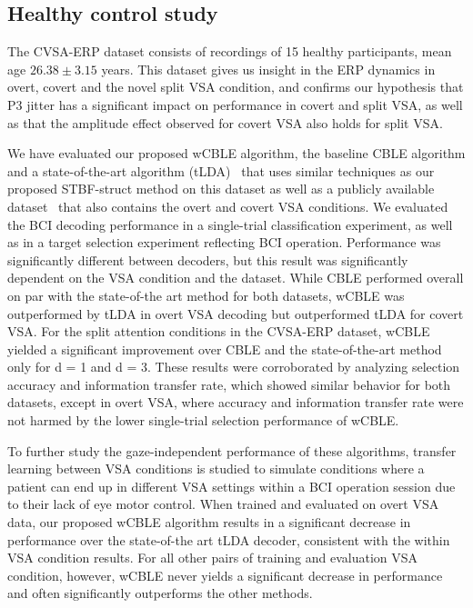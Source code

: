 \subsection{Healthy control study}
The CVSA-ERP dataset consists of recordings of 15 healthy participants, mean age
$26.38\pm3.15$ years.
This dataset gives us insight in the ERP dynamics in overt, covert and the
novel split VSA condition, and confirms our hypothesis that P3 jitter has a
significant impact on performance in covert and split VSA, as well as that the
amplitude effect observed for covert VSA also holds for split VSA.

We have evaluated our proposed wCBLE algorithm, the baseline CBLE algorithm and
a state-of-the-art algorithm (tLDA)~\cite{Sosulski2022} that uses similar techniques as our
proposed STBF-struct method on this dataset as well as a publicly available
dataset~\cite{Aloise2012} that also contains the overt and covert VSA conditions.
We evaluated the BCI decoding performance in a single-trial classification experiment,
as well as in a target selection experiment reflecting BCI operation.
Performance was significantly different between decoders, but this
result was significantly dependent on the VSA condition and the dataset.
While CBLE performed overall on par with the state-of-the art method for both datasets, wCBLE was
outperformed by tLDA in overt VSA decoding but outperformed
tLDA for covert VSA.
For the split attention conditions in the CVSA-ERP
dataset, wCBLE yielded a significant improvement over CBLE and the
state-of-the-art method only for d = 1 and d = 3.
These results were corroborated by analyzing selection accuracy and information
transfer rate, which showed similar behavior for both datasets, except in overt
VSA, where accuracy and information transfer rate were not harmed by the lower
single-trial selection performance of wCBLE.

To further study the gaze-independent performance of these algorithms, transfer
learning between VSA conditions is studied to simulate conditions where a patient
can end up in different VSA settings within a BCI operation session due to their
lack of eye motor control.
When trained and evaluated on overt VSA data, our proposed wCBLE algorithm results in a significant decrease in performance
over the state-of-the art tLDA decoder, consistent with the within VSA
condition results.
For all other pairs of training and evaluation VSA condition, however, wCBLE
never yields a significant decrease in performance and often significantly
outperforms the other methods.


